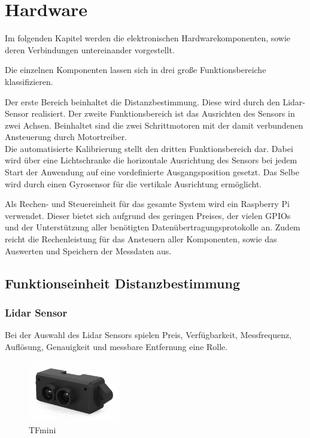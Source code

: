 
\chapter{Hardware}

Im folgenden Kapitel werden die elektronischen Hardwarekomponenten, sowie deren Verbindungen untereinander vorgestellt. 

Die einzelnen Komponenten lassen sich in drei große Funktionsbereiche klassifizieren.

Der erste Bereich beinhaltet die Distanzbestimmung. Diese wird durch den Lidar-Sensor realisiert.
Der zweite Funktionsbereich ist das Ausrichten des Sensors in zwei Achsen. Beinhaltet sind die zwei Schrittmotoren mit der damit verbundenen Ansteuerung durch Motortreiber. \\
Die automatisierte Kalibrierung stellt den dritten Funktionsbereich dar. Dabei wird über eine Lichtschranke die horizontale Ausrichtung des Sensors bei jedem Start der Anwendung auf eine vordefinierte Ausgangsposition gesetzt. Das Selbe wird durch einen Gyrosensor für die vertikale Ausrichtung ermöglicht.

Als Rechen- und Steuereinheit für das gesamte System wird ein Raspberry Pi verwendet. Dieser bietet sich aufgrund des geringen Preises, der vielen GPIOs und der Unterstützung aller benötigten Datenübertragungsprotokolle an. Zudem reicht die Rechenleistung für das Ansteuern aller Komponenten, sowie das Auswerten und Speichern der Messdaten aus.\\

\section{Funktionseinheit Distanzbestimmung}


\subsection{Lidar Sensor}

Bei der Auswahl des Lidar Sensors spielen Preis, Verfügbarkeit, Messfrequenz, Auflösung, Genauigkeit und messbare Entfernung eine Rolle.


\begin{figure}
	\vspace{-22pt}
	\hspace{5mm}
	\includegraphics[width=4cm]{images/Hardware/TFmini.png}
	\caption{TFmini}
	\vspace{-10pt}
	
\end{figure}

